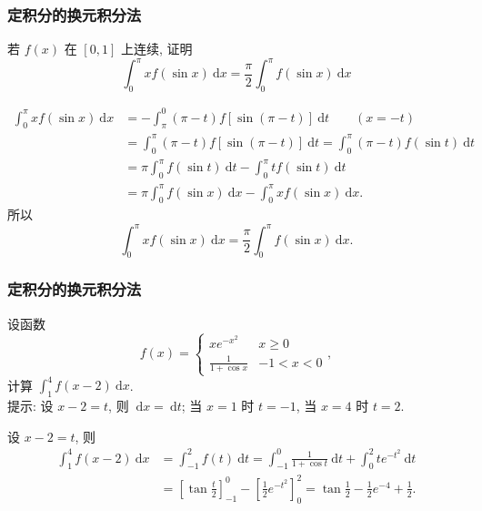 \documentclass[
10pt,
aspectratio=43,
]{beamer}
\begin{document}
\begin{frame}
	\frametitle{定积分的换元积分法}
	\everymath{\displaystyle}
	{\small
		\begin{block}{}
			若 $f(x)$ 在 $[0,1]$ 上连续, 证明\\\vspace{0.1cm}
			$$
				\int_0^\pi x f(\sin x) \mathrm{~d} x=\frac{\pi}{2} \int_0^\pi f(\sin x) \mathrm{~d} x
			$$
		\end{block}
		\pause
		\begin{exampleblock}{}
			$$
				\begin{aligned}
					\int_0^\pi x f(\sin x) \mathrm{~d} x & =-\int_\pi^0(\pi-t) f[\sin (\pi-t)] \mathrm{~d} t\qquad (x=-t)                             \\
					                                     & =\int_0^\pi(\pi-t) f[\sin (\pi-t)] \mathrm{~d} t=\int_0^\pi(\pi-t) f(\sin t) \mathrm{~d} t \\
					                                     & =\pi \int_0^\pi f(\sin t) \mathrm{~d} t-\int_0^\pi t f(\sin t) \mathrm{~d} t               \\
					                                     & =\pi \int_0^\pi f(\sin x) \mathrm{~d} x-\int_0^\pi x f(\sin x) \mathrm{~d} x.
				\end{aligned}
			$$
			所以
			$$
				\int_0^\pi x f(\sin x) \mathrm{~d} x=\frac{\pi}{2} \int_0^\pi f(\sin x) \mathrm{~d} x.
			$$
		\end{exampleblock}
	}
\end{frame}

\begin{frame}
	\frametitle{定积分的换元积分法}
	\everymath{\displaystyle}
	\begin{block}{}
		设函数
		$$
			f(x)=\left\{\begin{array}{cc}x e^{-x^2} & x \geq 0 \\ \frac{1}{1+\cos x} & -1<x<0\end{array}\right.,
		$$
		计算 $\int_1^4 f(x-2) \mathrm{~d} x$.\\\vspace{0.2cm}
		提示: 设 $x-2=t$, 则 $\mathrm{~d} x=\mathrm{~d} t$; 当 $x=1$ 时 $t=-1$, 当 $x=4$ 时 $t=2$.
	\end{block}
	\pause
	\begin{exampleblock}{}
		设 $x-2=t$, 则
		$$
			\begin{aligned}
				\int_1^4 f(x-2) \mathrm{~d} x & =\int_{-1}^2 f(t) \mathrm{~d} t=\int_{-1}^0 \frac{1}{1+\cos t} \mathrm{~d} t+\int_0^2 t e^{-t^2} \mathrm{~d} t                \\
				                              & =\left[\tan \frac{t}{2}\right]_{-1}^0-\left[\frac{1}{2} e^{-t^2}\right]_0^2=\tan \frac{1}{2}-\frac{1}{2} e^{-4}+\frac{1}{2} .
			\end{aligned}
		$$
	\end{exampleblock}
\end{frame}
\end{document}
